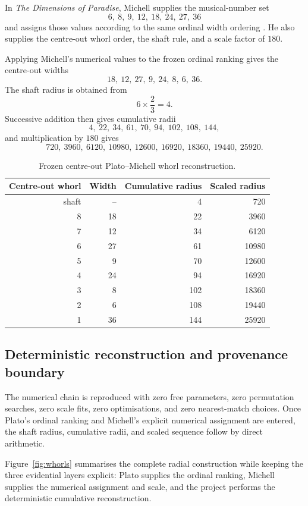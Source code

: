 \documentclass[11pt]{article}
\begin{document}
In \emph{The Dimensions of Paradise}, Michell supplies the musical-number set
\[
6,\ 8,\ 9,\ 12,\ 18,\ 24,\ 27,\ 36
\]
and assigns those values according to the same ordinal width ordering
\citep{michell2008dimensions}.  He also supplies the centre-out whorl order,
the shaft rule, and a scale factor of $180$.

Applying Michell's numerical values to the frozen ordinal ranking gives the
centre-out widths
\[
18,\ 12,\ 27,\ 9,\ 24,\ 8,\ 6,\ 36.
\]
The shaft radius is obtained from
\[
6\times\frac23=4.
\]
Successive addition then gives cumulative radii
\[
4,\ 22,\ 34,\ 61,\ 70,\ 94,\ 102,\ 108,\ 144,
\]
and multiplication by $180$ gives
\[
720,\ 3960,\ 6120,\ 10980,\ 12600,\ 16920,\ 18360,\ 19440,\ 25920.
\]

\begin{table}[ht]
\centering
\caption{Frozen centre-out Plato--Michell whorl reconstruction.}%
\label{tab:whorls}
\begin{tabular}{rrrr}
\toprule
Centre-out whorl & Width & Cumulative radius & Scaled radius \\
\midrule
shaft & -- & 4 & 720 \\
8 & 18 & 22 & 3960 \\
7 & 12 & 34 & 6120 \\
6 & 27 & 61 & 10980 \\
5 & 9  & 70 & 12600 \\
4 & 24 & 94 & 16920 \\
3 & 8  & 102 & 18360 \\
2 & 6  & 108 & 19440 \\
1 & 36 & 144 & 25920 \\
\bottomrule
\end{tabular}
\end{table}

\subsection{Deterministic reconstruction and provenance boundary}

The numerical chain is reproduced with zero free parameters, zero permutation
searches, zero scale fits, zero optimisations, and zero nearest-match choices.
Once Plato's ordinal ranking and Michell's explicit numerical assignment are
entered, the shaft radius, cumulative radii, and scaled sequence follow by
direct arithmetic.

Figure~\ref{fig:whorls} summarises the complete radial construction while
keeping the three evidential layers explicit: Plato supplies the ordinal
ranking, Michell supplies the numerical assignment and scale, and the project
performs the deterministic cumulative reconstruction.
\end{document}
